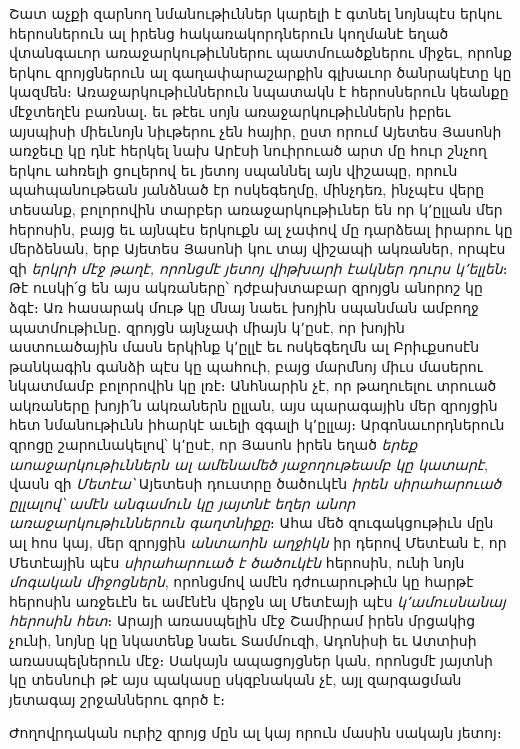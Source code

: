 \documentclass{article}
\begin{document}
{Շատ աչքի զարնող նմանութիւններ կարելի է գտնել նոյնպէս երկու հերոսներուն ալ իրենց հակառակորդներուն կողմանէ եղած վտանգաւոր առաջարկութիւններու պատմուածքներու միջեւ, որոնք երկու զրոյցներուն ալ գաղափարաշարքին գլխաւոր ծանրակէտը կը կազմեն։ Առաջարկութիւններուն նպատակն է հերոսներուն կեանքը մէջտեղէն բառնալ․ եւ թէեւ սոյն առաջարկութիւններն իբրեւ այսպիսի միեւնոյն նիւթերու չեն հայիր, ըստ որում Այետես Յասոնի առջեւը կը դնէ հերկել նախ Արէսի նուիրուած արտ մը հուր շնչող երկու ահռելի ցուլերով եւ յետոյ սպաննել այն վիշապը, որուն պահպանութեան յանձնած էր ոսկեգեղմը, մինչդեռ, ինչպէս վերը տեսանք, բոլորովին տարբեր առաջարկութիւներ են որ կ՚ըլլան մեր հերոսին, բայց եւ այնպէս երկուքն ալ չափով մը դարձեալ իրարու կը մերձենան, երբ Այետես Յասոնի կու տայ վիշապի ակռաներ, որպէս զի \emph{երկրի մէջ թաղէ, որոնցմէ յետոյ վիթխարի էակներ դուրս կ՚ելլեն}։ Թէ ուսկի՛ց են այս ակռաները՝ դժբախտաբար զրոյցն անորոշ կը ձգէ։ Առ հասարակ մութ կը մնայ նաեւ խոյին սպանման ամբողջ պատմութիւնը․ զրոյցն այնչափ միայն կ՚ըսէ, որ խոյին աստուածային մասն երկինք կ՚ըլլէ եւ ոսկեգեղմն ալ Բրիւքսոսէն թանկագին գանձի պէս կը պահուի, բայց մարմնոյ միւս մասերու նկատմամբ բոլորովին կը լռէ։ Անհնարին չէ, որ թաղուելու տրուած ակռաները խոյի՛ն ակռաներն ըլլան, այս պարագային մեր զրոյցին հետ նմանութիւնն իհարկէ աւելի զգալի կ՚ըլլայ։ Արգոնաւորդներուն զրոցը շարունակելով՝ կ՚ըսէ, որ Յասոն իրեն եղած \emph{երեք աոաջարկութիւններն ալ ամենամեծ յաջողութեամբ կը կատարէ}, վասն զի \emph{Մետէա՝} Այետեսի դուստրը ծածուկէն \emph{իրեն սիրահարուած ըլլալով՝ ամէն անգամուն կը յայտնէ եղեր անոր առաջարկութիւններուն գաղտնիքը}։ Ահա մեծ զուգակցութիւն մըն ալ հոս կայ, մեր զրոյցին \emph{անտաոին աղջիկն} իր դերով Մետէան է, որ Մետէային պէս \emph{սիրահարուած է ծածուկէն} հերոսին, ունի նոյն \emph{մոգական միջոցներն}, որոնցմով ամէն դժուարութիւն կը հարթէ հերոսին առջեւէն եւ ամէնէն վերջն ալ Մետէայի պէս \emph{կ՚ամուսնանայ հերոսին հետ}։ Արայի առասպելին մէջ Շամիրամ իրեն մրցակից չունի, նոյնը կը նկատենք նաեւ Տամմուզի, Ադոնիսի եւ Ատտիսի առասպելներուն մէջ։ Սակայն ապացոյցներ կան, որոնցմէ յայտնի կը տեսնուի թէ այս պակասը սկզբնական չէ, այլ զարգացման յետագայ շրջաններու գործ է։

Ժողովրդական ուրիշ զրոյց մըն ալ կայ որուն մասին սակայն յետոյ։}
\clearpage
\subsection{}
\end{document}
